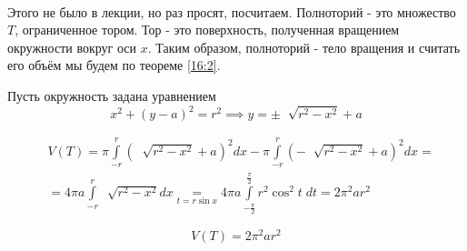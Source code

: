 \documentclass[../main.tex]{subfiles}
\begin{document}
\begin{example}
    
    ~


    Этого не было в лекции, но раз просят, посчитаем. Полноторий - это множество \( T\), ограниченное тором. Тор - это поверхность, полученная вращением окружности вокруг оси \( x\).
    Таким образом, полноторий - тело вращения и считать его объём мы будем по теореме \ref{16:2}. 
    
    Пусть окружность задана уравнением 
    \[ x^2+\left( y-a\right)^2=r^2 \implies y=\pm\; \sqrt[]{r^2-x^2}+a\]

    \vspace{6pt}
    \begin{flushleft}
        \begin{equation*}
            \begin{aligned}
                &V\left( T\right)= \pi \displaystyle\int\limits_{ -r}^{ r} \left( \; \sqrt[]{r^2-x^2}+a\right)^2dx- \pi \displaystyle\int\limits_{ -r}^{ r} \left( -\; \sqrt[]{r^2-x^2}+a\right)^2dx= \\ 
                &=4\pi a \displaystyle\int\limits_{ -r}^{ r} \; \sqrt[]{r^2-x^2}dx \underset{t=r\sin x}{=}4 \pi a \displaystyle\int\limits_{ - \frac{ \pi}{ 2}}^{ \frac{ \pi}{ 2}} r^2\cos^2 t\;dt=2 \pi^2 a r^2
            \end{aligned}
        \end{equation*}
    \end{flushleft}
    \[ V\left( T\right)=2 \pi^2 ar^2\]
\end{example}
\end{document}

